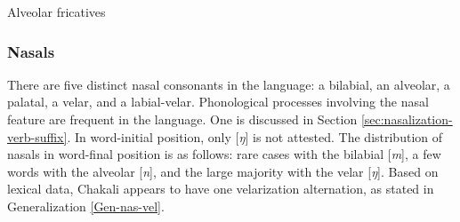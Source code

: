 
\begin{table}[!htb] \small
\centering
\caption{Alveolar  fricatives\label{tab:alveolar-fricatives}}

\quad
{}


\end{table}


\subsubsection{Nasals}
\label{sec:PHON-nasal}

There are  five distinct nasal consonants in the language: a bilabial, an 
alveolar, a 
palatal, a velar, and a labial-velar. Phonological processes involving the 
nasal feature are frequent in the language. One is discussed in Section 
\ref{sec:nasalization-verb-suffix}.  In word-initial position,  only  [{\it ŋ}] 
is not attested. The distribution of nasals in word-final position is as 
follows:  rare cases with the bilabial [{\it m}], a few words with the 
alveolar [{\it n}], and the large majority with the velar [{\it ŋ}].  Based on
lexical data,  Chakali appears to have one velarization alternation, as 
stated in Generalization \ref{Gen-nas-vel}.


